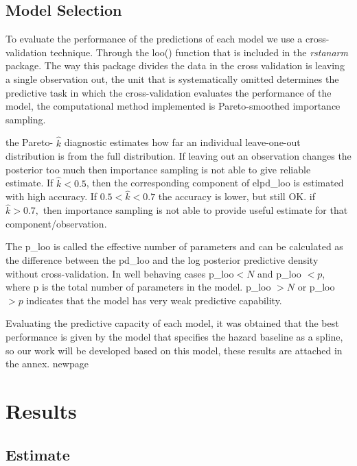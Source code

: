 \documentclass[
  twocolumn]{article}
\begin{document}
\hypertarget{model-selection}{%
\subsection{Model Selection}\label{model-selection}}

To evaluate the performance of the predictions of each model we use a
cross-validation technique. Through the loo() function that is included
in the \emph{rstanarm} package. The way this package divides the data in
the cross validation is leaving a single observation out, the unit that
is systematically omitted determines the predictive task in which the
cross-validation evaluates the performance of the model, the
computational method implemented is Pareto-smoothed importance sampling.

the Pareto- \(\hat{k}\) diagnostic estimates how far an individual
leave-one-out distribution is from the full distribution. If leaving out
an observation changes the posterior too much then importance sampling
is not able to give reliable estimate. If \(\hat{k}<0.5\), then the
corresponding component of elpd\_loo is estimated with high accuracy. If
\(0.5< \hat{k}<0.7\) the accuracy is lower, but still OK. if
\(\hat{k}>0.7,\) then importance sampling is not able to provide useful
estimate for that component/observation.

The p\_loo is called the effective number of parameters and can be
calculated as the difference between the pd\_loo and the log posterior
predictive density without cross-validation. In well behaving cases
p\_loo\(<N\) and p\_loo \(<p\), where p is the total number of
parameters in the model. p\_loo \(>N\) or p\_loo \(>p\) indicates that
the model has very weak predictive capability.

Evaluating the predictive capacity of each model, it was obtained that
the best performance is given by the model that specifies the hazard
baseline as a spline, so our work will be developed based on this model,
these results are attached in the annex. newpage \newpage

\hypertarget{results}{%
\section{Results}\label{results}}

\hypertarget{estimate}{%
\subsection{Estimate}\label{estimate}}
\end{document}
